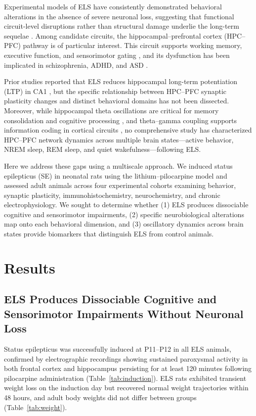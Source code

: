 \documentclass[11pt]{article}
\begin{document}
Experimental models of ELS have consistently demonstrated behavioral alterations in the absence of severe neuronal loss, suggesting that functional circuit-level disruptions rather than structural damage underlie the long-term sequelae \citep{huang2002long, gerber2013early}. Among candidate circuits, the hippocampal--prefrontal cortex (HPC--PFC) pathway is of particular interest. This circuit supports working memory, executive function, and sensorimotor gating \citep{jones2008maturation, sigurdsson2010impaired}, and its dysfunction has been implicated in schizophrenia, ADHD, and ASD \citep{sotoyama2011disrupted, liddle2000schizophrenia}.

Prior studies reported that ELS reduces hippocampal long-term potentiation (LTP) in CA1 \citep{huang2002long}, but the specific relationship between HPC--PFC synaptic plasticity changes and distinct behavioral domains has not been dissected. Moreover, while hippocampal theta oscillations are critical for memory consolidation and cognitive processing \citep{buzsaki2002theta}, and theta--gamma coupling supports information coding in cortical circuits \citep{jensen2007cross, canolty2010high}, no comprehensive study has characterized HPC--PFC network dynamics across multiple brain states---active behavior, NREM sleep, REM sleep, and quiet wakefulness---following ELS.

Here we address these gaps using a multiscale approach. We induced status epilepticus (SE) in neonatal rats using the lithium--pilocarpine model and assessed adult animals across four experimental cohorts examining behavior, synaptic plasticity, immunohistochemistry, neurochemistry, and chronic electrophysiology. We sought to determine whether (1) ELS produces dissociable cognitive and sensorimotor impairments, (2) specific neurobiological alterations map onto each behavioral dimension, and (3) oscillatory dynamics across brain states provide biomarkers that distinguish ELS from control animals.

\section{Results}

\subsection{ELS Produces Dissociable Cognitive and Sensorimotor Impairments Without Neuronal Loss}

Status epilepticus was successfully induced at P11--P12 in all ELS animals, confirmed by electrographic recordings showing sustained paroxysmal activity in both frontal cortex and hippocampus persisting for at least 120 minutes following pilocarpine administration (Table~\ref{tab:induction}). ELS rats exhibited transient weight loss on the induction day but recovered normal weight trajectories within 48 hours, and adult body weights did not differ between groups (Table~\ref{tab:weight}).
\end{document}
